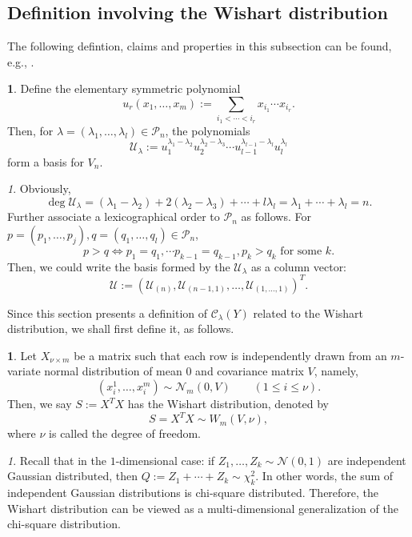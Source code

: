 \documentclass[10pt,oneside,american]{amsart}
\numberwithin{equation}{section}
\numberwithin{figure}{section}
\theoremstyle{plain}
\theoremstyle{definition}
\newtheorem{defn}[thm]{\protect\definitionname}
\theoremstyle{remark}
\newtheorem{rem}[thm]{\protect\remarkname}
\theoremstyle{plain}
\theoremstyle{definition}
\theoremstyle{plain}
\theoremstyle{plain}
\providecommand{\definitionname}{Definition}
\providecommand{\remarkname}{Remark}
\begin{document}
\subsection{Definition involving the Wishart distribution}
The following defintion, claims and properties in this subsection can be found, e.g., \cite[pp.~9--22]{Takemura}.
\begin{defn}
Define the elementary symmetric polynomial
\[
u_{r}(x_{1},\ldots,x_{m}):=\underset{i_{1}<\cdots<i_{r}}{\sum}x_{i_{1}}\cdots x_{i_{r}}.
\]
Then, for $\lambda=\left(\lambda_{1},\ldots,\lambda_{l}\right)\in\mathcal{P}_{n}$,
the polynomials
\[
\mathcal{U}_{\lambda}:=u_{1}^{\lambda_{1}-\lambda_{2}}u_{2}^{\lambda_{2}-\lambda_{3}}\cdots u_{l-1}^{\lambda_{l-1}-\lambda_{l}}u_{l}^{\lambda_{l}}
\]
form a basis for $V_{n}$.
\end{defn}
\begin{rem}
Obviously, 
\[
\deg\mathcal{U}_{\lambda}=\left(\lambda_{1}-\lambda_{2}\right)+2\left(\lambda_{2}-\lambda_{3}\right)+\cdots+l\lambda_{l}=\lambda_{1}+\cdots+\lambda_{l}=n.
\]
Further associate a lexicographical order to $\mathcal{P}_{n}$ as follows. 
For $p=\left(p_{1},\ldots,p_{j}\right),q=\left(q_{1},\ldots,q_{l}\right)\in\mathcal{P}_{n}$,
\[
p>q\Leftrightarrow p_{1}=q_{1},\cdots p_{k-1}=q_{k-1},p_{k}>q_{k}\text{ for some }k.
\]
Then, we could write the basis formed by the $\mathcal{U}_{\lambda}$
as a column vector:
\[
\mathcal{U}:=\left(\mathcal{U}_{\left(n\right)},\mathcal{U}_{\left(n-1,1\right)},\ldots,\mathcal{U}_{\left(1,\ldots,1\right)}\right)^{T}.
\]
\end{rem}
Since this section presents a definition of $\mathcal{C}_{\lambda}(Y)$
related to the Wishart distribution, we shall first define it, as follows.
\begin{defn}
Let $X_{\nu\times m}$ be a matrix such that each row is independently drawn
from an $m$-variate normal distribution of mean $0$ and covariance
matrix $V$, namely, 
\[
  \left(x_{i}^{1},\ldots,x_{i}^{m}\right)\sim\mathcal{N}_{m}(0,V)
  \qquad (1\leq i\leq\nu).
\]
Then, we say $S:=X^{T}X$ has the Wishart distribution, denoted by
\[
S=X^{T}X\sim W_{m}(V,\nu),
\]
where $\nu$ is called the degree of freedom.
\end{defn}
\begin{rem}
Recall that in the $1$-dimensional case: if $Z_{1},\ldots,Z_{k}\sim\mathcal{N}(0,1)$
are independent Gaussian distributed, then $Q:=Z_{1}+\cdots+Z_{k}\sim\chi_{k}^{2}$.
In other words, the sum of independent Gaussian distributions is chi-square
distributed. Therefore, the Wishart distribution can be viewed as a multi-dimensional
generalization of the chi-square distribution.
\end{rem}
\end{document}

